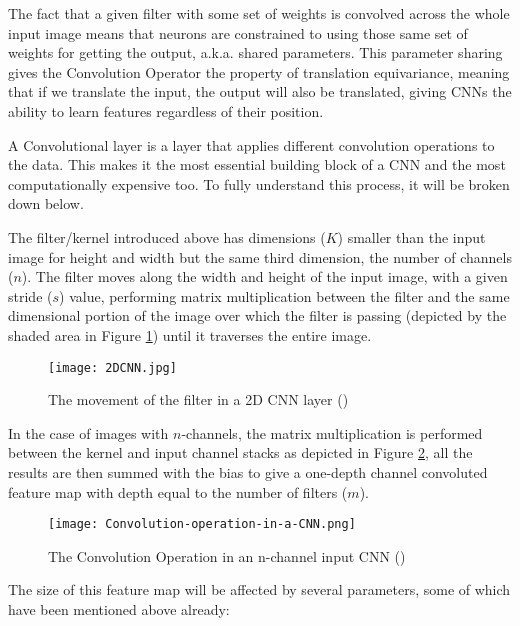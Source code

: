 The fact that a given filter with some set of weights is convolved across the whole input image means that neurons are constrained to using those same set of weights for getting the output, \gls{a.k.a.} shared parameters. This parameter sharing gives the Convolution Operator the property of translation equivariance, meaning that if we translate the input, the output will also be translated, giving \gls{CNN}s the ability to learn features regardless of their position.

A Convolutional layer is a layer that applies different convolution operations to the data. This makes it the most essential building block of a \gls{CNN} and the most computationally expensive too. To fully understand this process, it will be broken down below.

The filter/kernel introduced above has dimensions ($K$) smaller than the input image for height and width but the same third dimension, the number of channels ($n$). The filter moves along the width and height of the input image, with a given stride ($s$) value, performing matrix multiplication between the filter and the same dimensional portion of the image over which the filter is passing (depicted by the shaded area in Figure \ref{fig_cnn_filter}) until it traverses the entire image.

    \begin{figure}[hbt!]
        \centering
        \texttt{[image: 2DCNN.jpg]}
        \caption{The movement of the filter in a 2D \gls{CNN} layer (\cite{2dcnnpic})}
        \label{fig_cnn_filter}
    \end{figure}
     
In the case of images with $n$-channels, the matrix multiplication is performed between the kernel and input channel stacks as depicted in Figure \ref{fig_cnn_conv}, all the results are then summed with the bias to give a one-depth channel convoluted feature map with depth equal to the number of filters ($m$).

    \begin{figure}[hbt!]
        \centering
        \texttt{[image: Convolution-operation-in-a-CNN.png]}
        \caption{The Convolution Operation in an n-channel input \gls{CNN} (\cite{9053228})}
        \label{fig_cnn_conv}
    \end{figure}
      
The size of this feature map will be affected by several parameters, some of which have been mentioned above already:

